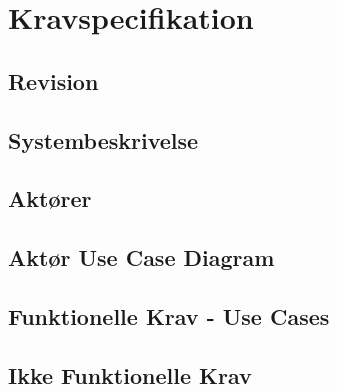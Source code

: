 \chapter{Kravspecifikation}

\section{Revision}


\section{Systembeskrivelse}


\section{Aktører}


\section{Aktør Use Case Diagram}


\section{Funktionelle Krav - Use Cases}


\section{Ikke Funktionelle Krav}
